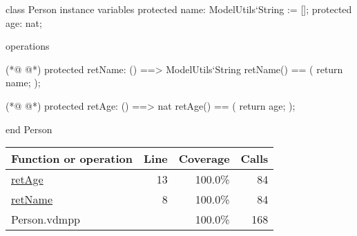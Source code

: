 \begin{vdmpp}[breaklines=true]
class Person
instance variables
  protected name: ModelUtils`String := [];
  protected age: nat;
  
operations

(*@
\label{retName:8}
@*)
  protected retName: () ==> ModelUtils`String
  retName() == (
    return name;  
  );
 
(*@
\label{retAge:13}
@*)
  protected retAge: () ==> nat
  retAge() == (
    return age;  
  );
  

end Person
\end{vdmpp}
\bigskip
\begin{longtable}{|l|r|r|r|}
\hline
Function or operation & Line & Coverage & Calls \\
\hline
\hline
\hyperref[retAge:13]{retAge} & 13&100.0\% & 84 \\
\hline
\hyperref[retName:8]{retName} & 8&100.0\% & 84 \\
\hline
\hline
Person.vdmpp & & 100.0\% & 168 \\
\hline
\end{longtable}

